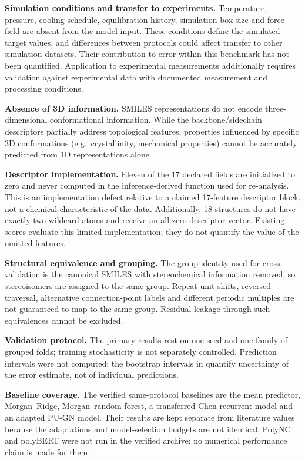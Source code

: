 \documentclass{article}
\begin{document}
\textbf{Simulation conditions and transfer to experiments.} Temperature, pressure, cooling schedule, equilibration history, simulation box size and force field are absent from the model input. These conditions define the simulated target values, and differences between protocols could affect transfer to other simulation datasets. Their contribution to error within this benchmark has not been quantified. Application to experimental measurements additionally requires validation against experimental data with documented measurement and processing conditions.

\textbf{Absence of 3D information.} SMILES representations do not encode three-dimensional conformational information. While the backbone/sidechain descriptors partially address topological features, properties influenced by specific 3D conformations (e.g.\ crystallinity, mechanical properties) cannot be accurately predicted from 1D representations alone.

\textbf{Descriptor implementation.} Eleven of the 17 declared fields are initialized to zero and never computed in the inference-derived function used for re-analysis. This is an implementation defect relative to a claimed 17-feature descriptor block, not a chemical characteristic of the data. Additionally, 18 structures do not have exactly two wildcard atoms and receive an all-zero descriptor vector. Existing scores evaluate this limited implementation; they do not quantify the value of the omitted features.

\textbf{Structural equivalence and grouping.} The group identity used for cross-validation is the canonical SMILES with stereochemical information removed, so stereoisomers are assigned to the same group. Repeat-unit shifts, reversed traversal, alternative connection-point labels and different periodic multiples are not guaranteed to map to the same group. Residual leakage through such equivalences cannot be excluded.

\textbf{Validation protocol.} The primary results rest on one seed and one family of grouped folds; training stochasticity is not separately controlled. Prediction intervals were not computed; the bootstrap intervals in  quantify uncertainty of the error estimate, not of individual predictions.

\textbf{Baseline coverage.} The verified same-protocol baselines are the mean predictor, Morgan--Ridge, Morgan--random forest, a transferred Chen recurrent model and an adapted PU-GN model. Their results are kept separate from literature values because the adaptations and model-selection budgets are not identical. PolyNC and polyBERT were not run in the verified archive; no numerical performance claim is made for them.
\end{document}
